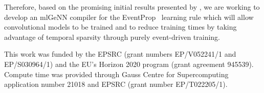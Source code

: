 \documentclass[sigconf]{acmart}
\begin{document}
Therefore, based on the promising initial results presented by \citet{NowotnyLoss2022}, we are working to develop an mlGeNN compiler for the EventProp~\citep{Wunderlich2021} learning rule which will allow convolutional models to be trained and to reduce training times by taking advantage of temporal sparsity through purely event-driven training.
\begin{acks}
This work was funded by the EPSRC (grant numbers EP/V052241/1 and EP/S030964/1) and the EU's Horizon 2020 program (grant agreement 945539).
Compute time was provided through Gauss Centre for Supercomputing application number 21018 and EPSRC (grant number EP/T022205/1).
\end{acks}

\balance


\end{document}

